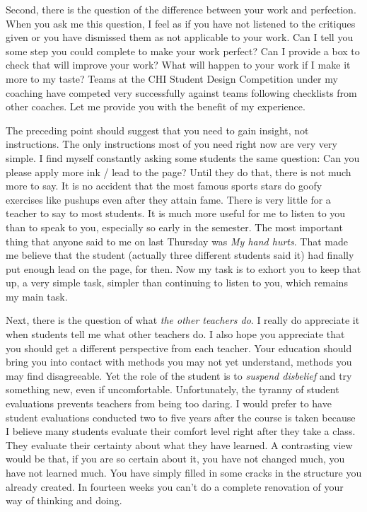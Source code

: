 Second, there is the question of the difference between your work and
perfection. When you ask me this question, I feel as if you have not
listened to the critiques given or you have dismissed them as not
applicable to your work. Can I tell you some step you could complete to
make your work perfect? Can I provide a box to check that will improve
your work? What will happen to your work if I make it more to my taste?
Teams at the CHI Student Design Competition under my coaching have
competed very successfully against teams following checklists from other
coaches. Let me provide you with the benefit of my experience.

The preceding point should suggest that you need to gain insight, not
instructions. The only instructions most of you need right now are very
very simple. I find myself constantly asking some students the same
question: Can you please apply more ink / lead to the page? Until they
do that, there is not much more to say. It is no accident that the most
famous sports stars do goofy exercises like pushups even after they
attain fame. There is very little for a teacher to say to most students.
It is much more useful for me to listen to you than to speak to you,
especially so early in the semester. The most important thing that
anyone said to me on last Thursday was \emph{My hand hurts}. That made
me believe that the student (actually three different students said it)
had finally put enough lead on the page, for then. Now my task is to
exhort you to keep that up, a very simple task, simpler than continuing
to listen to you, which remains my main task.

Next, there is the question of what \emph{the other teachers do}. I
really do appreciate it when students tell me what other teachers do. I
also hope you appreciate that you should get a different perspective
from each teacher. Your education should bring you into contact with
methods you may not yet understand, methods you may find disagreeable.
Yet the role of the student is to \emph{suspend disbelief} and try
something new, even if uncomfortable. Unfortunately, the tyranny of
student evaluations prevents teachers from being too daring. I would
prefer to have student evaluations conducted two to five years after the
course is taken because I believe many students evaluate their comfort
level right after they take a class. They evaluate their certainty about
what they have learned. A contrasting view would be that, if you are so
certain about it, you have not changed much, you have not learned much.
You have simply filled in some cracks in the structure you already
created. In fourteen weeks you can't do a complete renovation of your
way of thinking and doing.


